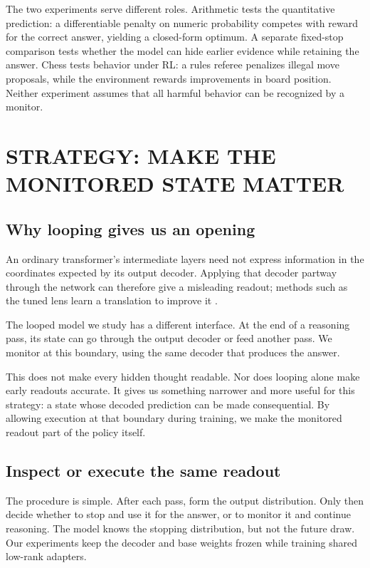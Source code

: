 The two experiments serve different roles. Arithmetic tests the quantitative prediction: a differentiable penalty on numeric probability competes with reward for the correct answer, yielding a closed-form optimum. A separate fixed-stop comparison tests whether the model can hide earlier evidence while retaining the answer. Chess tests behavior under RL: a rules referee penalizes illegal move proposals, while the environment rewards improvements in board position. Neither experiment assumes that all harmful behavior can be recognized by a monitor.

\section{STRATEGY: MAKE THE MONITORED STATE MATTER}
\label{sec:mechanism}
\subsection{Why looping gives us an opening}
An ordinary transformer's intermediate layers need not express information in the coordinates expected by its output decoder. Applying that decoder partway through the network can therefore give a misleading readout; methods such as the tuned lens learn a translation to improve it \citep{belrose2023}.

The looped model we study has a different interface. At the end of a reasoning pass, its state can go through the output decoder or feed another pass. We monitor at this boundary, using the same decoder that produces the answer. 

This does not make every hidden thought readable. Nor does looping alone make early readouts accurate. It gives us something narrower and more useful for this strategy: a state whose decoded prediction can be made consequential. By allowing execution at that boundary during training, we make the monitored readout part of the policy itself.

\subsection{Inspect or execute the same readout}
The procedure is simple. After each pass, form the output distribution. Only then decide whether to stop and use it for the answer, or to monitor it and continue reasoning. The model knows the stopping distribution, but not the future draw. Our experiments keep the decoder and base weights frozen while training shared low-rank adapters.

